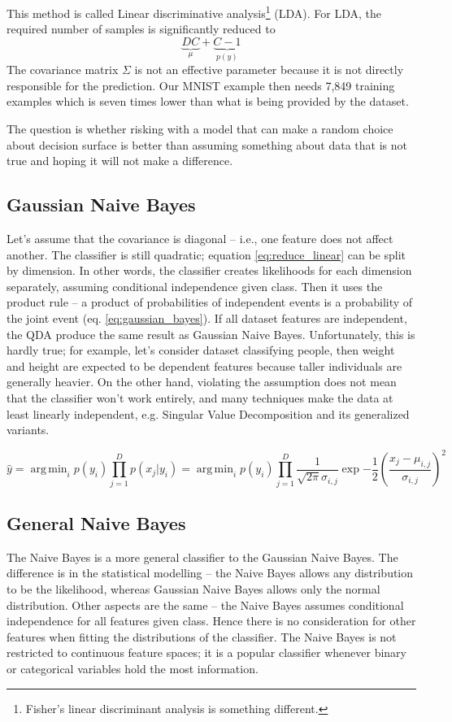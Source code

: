 \documentclass{article}
\DeclareMathOperator*{\argmin}{arg\,min}
\begin{document}
This method is called Linear discriminative analysis\footnote{Fisher's linear discriminant analysis is something different.} (LDA). 
For LDA, the required number of samples is significantly reduced to 
$$
    \underbrace{DC}_{\mu} + \underbrace{C - 1}_{p(y)}
$$
The covariance matrix $\Sigma$ is not an effective parameter because it is not directly responsible for the prediction.
Our MNIST example then needs 7,849 training examples which is seven times lower than what is being provided by the dataset.

The question is whether risking with a model that can make a random choice about decision surface is better 
than assuming something about data that is not true and hoping it will not make a difference.




\subsection{Gaussian Naive Bayes}
Let's assume that the covariance is diagonal -- i.e., one feature does not affect another. 
The classifier is still quadratic; equation \ref{eq:reduce_linear} can be split by dimension. 
In other words, the classifier creates likelihoods for each dimension separately, 
assuming conditional independence given class. 
Then it uses the product rule -- a product of probabilities of independent events is a probability of the joint event (eq. \ref{eq:gaussian_bayes}).
If all dataset features are independent, the QDA produce the same result as Gaussian Naive Bayes.
Unfortunately, this is hardly true; for example, let's consider dataset classifying people, 
then weight and height are expected to be dependent features because taller individuals are generally heavier. 
On the other hand, violating the assumption does not mean that the classifier won't work entirely, 
and many techniques make the data at least linearly independent, e.g. Singular Value Decomposition and its generalized variants.

\begin{equation}
    \hat{y} = \argmin_i p(y_i) \prod_{j=1}^D p(x_j | y_i) = 
    \argmin_i p(y_i) \prod_{j=1}^D 
        \frac{1}{\sqrt{2 \pi} \sigma_{i,j}} \exp{-\frac{1}{2} \left(\frac{x_j - \mu_{i,j}}{\sigma_{i,j}}\right)^2} 
    \label{eq:gaussian_bayes}
\end{equation}

\subsection{General Naive Bayes}
The Naive Bayes is a more general classifier to the Gaussian Naive Bayes.
The difference is in the statistical modelling -- the Naive Bayes allows any distribution to be the likelihood, whereas Gaussian Naive Bayes allows only the normal distribution.
Other aspects are the same -- the Naive Bayes assumes conditional independence for all features given class. 
Hence there is no consideration for other features when fitting the distributions of the classifier.
The Naive Bayes is not restricted to continuous feature spaces; it is a popular classifier whenever binary or categorical variables hold the most information.
\end{document}
